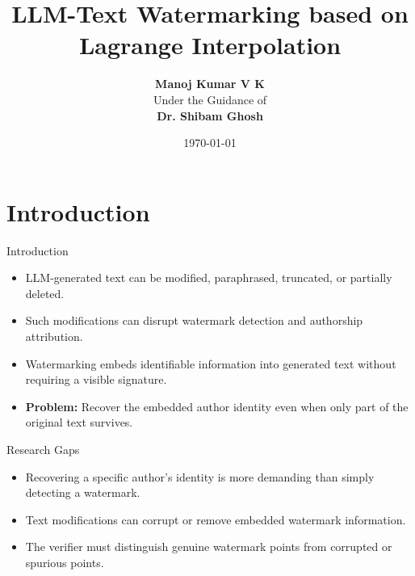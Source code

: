 \documentclass[xcolor=dvipsnames,aspectratio=169]{beamer}
\title[Paper Presentation]{LLM-Text Watermarking based on Lagrange Interpolation}
\author[Manoj Kumar]{
	\vspace{-0.2cm}
	\textbf{Manoj Kumar V K} \\
	\vspace{0.2cm}
	{\small Under the Guidance of \\ 
	\textbf{Dr. Shibam Ghosh}}
}
\institute[IIT Hyderabad]{
	Department of Computer Science\\
	Indian Insitute of Technogology Hyderabad
}
\date{\today}
\begin{document}
	
	\begin{frame}
		\titlepage
	\end{frame}
	
	\begin{frame}
		\tableofcontents
	\end{frame}
	
	\section{Introduction}
	\begin{frame}{Introduction}
		\begin{itemize}
			\item LLM-generated text can be modified, paraphrased, truncated, or partially deleted.
			\item Such modifications can disrupt watermark detection and authorship attribution.
			\item Watermarking embeds identifiable information into generated text without requiring a visible signature.
			\item \textbf{Problem:} Recover the embedded author identity even when only part of the original text survives.
		\end{itemize}
	\end{frame}
	
	\begin{frame}{Research Gaps}
		\begin{itemize}
			\item Recovering a specific author's identity is more demanding than simply detecting a watermark.
			\item Text modifications can corrupt or remove embedded watermark information.
			\item The verifier must distinguish genuine watermark points from corrupted or spurious points.
		\end{itemize}
	\end{frame}
	
	
\end{document}
